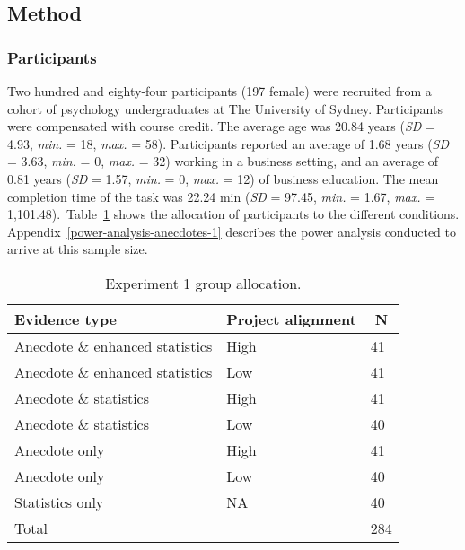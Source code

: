 \documentclass[a4paper, nobind]{templates/ociamthesis}
\theoremstyle{definition}
\theoremstyle{definition}
\theoremstyle{definition}
\theoremstyle{definition}
\theoremstyle{remark}
\begin{document}
\hypertarget{method-anecdotes-1}{%
\subsection{Method}\label{method-anecdotes-1}}

\subsubsection{Participants}

Two hundred and eighty-four participants (197 female) were recruited from a cohort of psychology undergraduates at The University of Sydney. Participants were compensated with course credit. The average age was 20.84 years (\emph{SD} = 4.93, \emph{min.} = 18, \emph{max.} = 58). Participants reported an average of 1.68 years (\emph{SD} = 3.63, \emph{min.} = 0, \emph{max.} = 32) working in a business setting, and an average of 0.81 years (\emph{SD} = 1.57, \emph{min.} = 0, \emph{max.} = 12) of business education. The mean completion time of the task was 22.24 min (\emph{SD} = 97.45, \emph{min.} = 1.67, \emph{max.} = 1,101.48).~Table~\ref{tab:condition-allocation-anecdotes-1}
shows the allocation of participants to the different conditions.
Appendix~\ref{power-analysis-anecdotes-1} describes the power analysis
conducted to arrive at this sample size.

\begin{table}[tbp]

\begin{center}
\begin{threeparttable}

\caption{\label{tab:condition-allocation-anecdotes-1}Experiment 1 group allocation.}

\begin{tabular}{lll}
\toprule
Evidence type & \multicolumn{1}{c}{Project alignment} & \multicolumn{1}{c}{N}\\
\midrule
Anecdote \& enhanced statistics & High & 41\\
Anecdote \& enhanced statistics & Low & 41\\
Anecdote \& statistics & High & 41\\
Anecdote \& statistics & Low & 40\\
Anecdote only & High & 41\\
Anecdote only & Low & 40\\
Statistics only & NA & 40\\
Total &  & 284\\
\bottomrule
\end{tabular}

\end{threeparttable}
\end{center}

\end{table}
\end{document}
